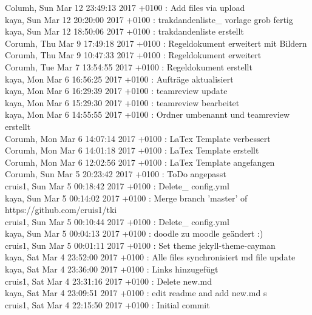 Columh, Sun Mar 12 23:49:13 2017 +0100 : Add files via upload\\
kaya, Sun Mar 12 20:20:00 2017 +0100 : trakdandenliste\_ vorlage grob fertig\\
kaya, Sun Mar 12 18:50:06 2017 +0100 : trakdandenliste erstellt\\
Corumh, Thu Mar 9 17:49:18 2017 +0100 : Regeldokument erweitert mit Bildern\\
Corumh, Thu Mar 9 10:47:33 2017 +0100 : Regeldokument erweitert\\
Corumh, Tue Mar 7 13:54:55 2017 +0100 : Regeldokument erstellt\\
kaya, Mon Mar 6 16:56:25 2017 +0100 : Aufträge aktualisiert\\
kaya, Mon Mar 6 16:29:39 2017 +0100 : teamreview update\\
kaya, Mon Mar 6 15:29:30 2017 +0100 : teamreview bearbeitet\\
kaya, Mon Mar 6 14:55:55 2017 +0100 : Ordner umbenannt und teamreview erstellt\\
Corumh, Mon Mar 6 14:07:14 2017 +0100 : LaTex Template verbessert\\
Corumh, Mon Mar 6 14:01:18 2017 +0100 : LaTex Template erstellt\\
Corumh, Mon Mar 6 12:02:56 2017 +0100 : LaTex Template angefangen\\
Corumh, Sun Mar 5 20:23:42 2017 +0100 : ToDo angepasst\\
cruis1, Sun Mar 5 00:18:42 2017 +0100 : Delete\_ config.yml\\
kaya, Sun Mar 5 00:14:02 2017 +0100 : Merge branch 'master' of https://github.com/cruis1/tki\\
cruis1, Sun Mar 5 00:10:44 2017 +0100 : Delete\_ config.yml\\
kaya, Sun Mar 5 00:04:13 2017 +0100 : doodle zu moodle geändert :)\\
cruis1, Sun Mar 5 00:01:11 2017 +0100 : Set theme jekyll-theme-cayman\\
kaya, Sat Mar 4 23:52:00 2017 +0100 : Alle files synchronisiert md file update\\
kaya, Sat Mar 4 23:36:00 2017 +0100 : Links hinzugefügt\\
cruis1, Sat Mar 4 23:31:16 2017 +0100 : Delete new.md\\
kaya, Sat Mar 4 23:09:51 2017 +0100 : edit readme and add new.md s\\
cruis1, Sat Mar 4 22:15:50 2017 +0100 : Initial commit\\



